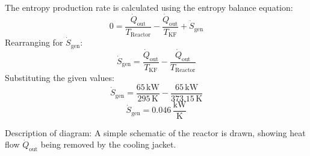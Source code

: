 The entropy production rate is calculated using the entropy balance equation:  
\[
0 = \frac{\dot{Q}_{\text{out}}}{T_{\text{Reactor}}} - \frac{\dot{Q}_{\text{out}}}{T_{\text{KF}}} + \dot{S}_{\text{gen}}
\]  
Rearranging for \( \dot{S}_{\text{gen}} \):  
\[
\dot{S}_{\text{gen}} = \frac{\dot{Q}_{\text{out}}}{T_{\text{KF}}} - \frac{\dot{Q}_{\text{out}}}{T_{\text{Reactor}}}
\]  
Substituting the given values:  
\[
\dot{S}_{\text{gen}} = \frac{65 \, \text{kW}}{295 \, \text{K}} - \frac{65 \, \text{kW}}{373.15 \, \text{K}}
\]  
\[
\dot{S}_{\text{gen}} = 0.046 \, \frac{\text{kW}}{\text{K}}
\]  

Description of diagram:  
A simple schematic of the reactor is drawn, showing heat flow \( \dot{Q}_{\text{out}} \) being removed by the cooling jacket.